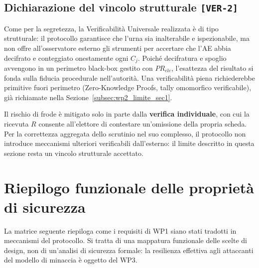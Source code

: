 \subsection{Dichiarazione del vincolo strutturale \texttt{[VER-2]}}
\label{subsec:wp2_limite_ver2}

Come per la segretezza, la Verificabilità Universale realizzata è di tipo strutturale: il protocollo garantisce che l'urna sia inalterabile e ispezionabile, ma non offre all'osservatore esterno gli strumenti per accertare che l'AE abbia decifrato e conteggiato onestamente ogni $C_j$. Poiché decifratura e spoglio avvengono in un perimetro black-box gestito con $PR_{ele}$, l'esattezza del risultato si fonda sulla fiducia procedurale nell'autorità. Una verificabilità piena richiederebbe primitive fuori perimetro (Zero-Knowledge Proofs, tally omomorfico verificabile), già richiamate nella Sezione~\ref{subsec:wp2_limite_sec1}.

Il rischio di frode è mitigato solo in parte dalla \textbf{verifica individuale}, con cui la ricevuta $R$ consente all'elettore di contestare un'omissione della propria scheda. Per la correttezza aggregata dello scrutinio nel suo complesso, il protocollo non introduce meccanismi ulteriori verificabili dall'esterno: il limite descritto in questa sezione resta un vincolo strutturale accettato.


\section{Riepilogo funzionale delle proprietà di sicurezza}
\label{sec:riepilogo_proprieta}

La matrice seguente riepiloga come i requisiti di WP1 siano stati tradotti in meccanismi del protocollo. Si tratta di una mappatura funzionale delle scelte di design, non di un'analisi di sicurezza formale: la resilienza effettiva agli attaccanti del modello di minaccia è oggetto del WP3.

